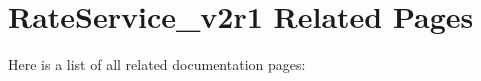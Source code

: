 \section{Rate\-Service\_\-v2r1 Related Pages}
Here is a list of all related documentation pages:\begin{CompactList}
\item {}

\end{CompactList}
